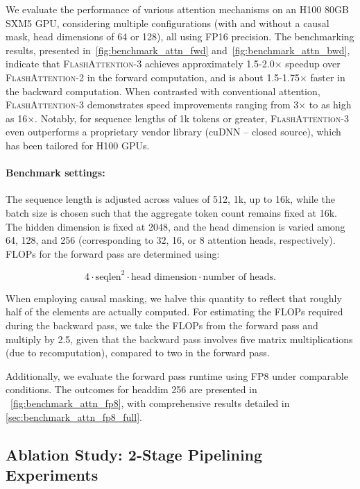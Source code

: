 \begin{algorithm}[H]
\begin{algorithmic}[1]
We evaluate the performance of various attention mechanisms on an H100 80GB SXM5 GPU, considering multiple configurations (with and without a causal mask, head dimensions of 64 or 128), all using FP16 precision. The benchmarking results, presented in~\cref{fig:benchmark_attn_fwd} and~\cref{fig:benchmark_attn_bwd}, indicate that \textsc{FlashAttention-3} achieves approximately 1.5-2.0$\times$ speedup over \textsc{FlashAttention-2} in the forward computation, and is about 1.5-1.75$\times$ faster in the backward computation. When contrasted with conventional attention, \textsc{FlashAttention-3} demonstrates speed improvements ranging from 3$\times$ to as high as 16$\times$. Notably, for sequence lengths of 1k tokens or greater, \textsc{FlashAttention-3} even outperforms a proprietary vendor library (cuDNN -- closed source), which has been tailored for H100 GPUs.

\paragraph{Benchmark settings:} The sequence length is adjusted across values of 512, 1k, up to 16k, while the batch size is chosen such that the aggregate token count remains fixed at 16k. The hidden dimension is fixed at 2048, and the head dimension is varied among 64, 128, and 256 (corresponding to 32, 16, or 8 attention heads, respectively). FLOPs for the forward pass are determined using:

\begin{equation*}
  4 \cdot \text{seqlen}^2 \cdot \text{head dimension} \cdot \text{number of heads}.
\end{equation*}

When employing causal masking, we halve this quantity to reflect that roughly half of the elements are actually computed. For estimating the FLOPs required during the backward pass, we take the FLOPs from the forward pass and multiply by 2.5, given that the backward pass involves five matrix multiplications (due to recomputation), compared to two in the forward pass.

Additionally, we evaluate the forward pass runtime using FP8 under comparable conditions. The outcomes for headdim 256 are presented in ~\cref{fig:benchmark_attn_fp8}, with comprehensive results detailed in \cref{sec:benchmark_attn_fp8_full}.

\subsection{Ablation Study: 2-Stage Pipelining Experiments}
\label{sec:2-stage-pipelining-experiments}


\end{algorithmic}
\end{algorithm}
